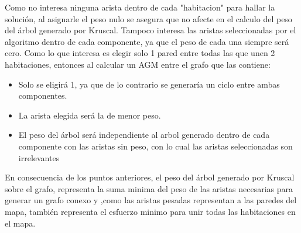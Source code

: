 Como no interesa ninguna arista dentro de cada "habitacion" para hallar la solución, al asignarle el peso nulo se asegura que no afecte en el calculo del peso del árbol generado por Kruscal. Tampoco interesa las aristas seleccionadas por el algoritmo dentro de cada componente, ya que el peso de cada una siempre será cero. Como lo que interesa es elegir solo 1 pared entre todas las que unen 2 habitaciones, entonces al calcular un AGM entre el grafo que las contiene:
\begin{itemize}
\item Solo se eligirá 1, ya que de lo contrario se generaría un ciclo entre ambas componentes.
\item La arista elegida será la de menor peso.
\item El peso del árbol será independiente al arbol generado dentro de cada componente con las aristas sin peso, con lo cual las aristas seleccionadas son irrelevantes
\end{itemize}

En consecuencia de los puntos anteriores, el peso del árbol generado por Kruscal sobre el grafo, representa la suma minima del peso de las aristas necesarias para generar un grafo conexo y ,como las aristas pesadas representan a las paredes del mapa, también representa el esfuerzo minimo para unir todas las habitaciones en el mapa. 


